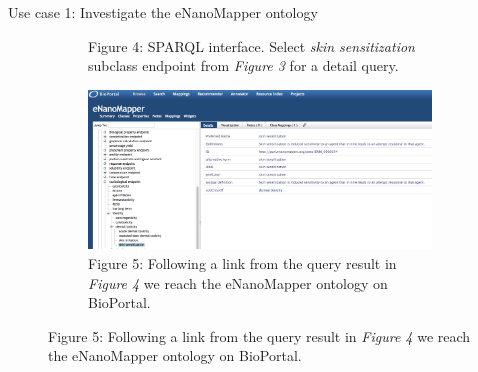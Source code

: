 \documentclass[final]{beamer}
\begin{document}
\begin{frame}{}
\begin{textblock}{62}
\begin{block}{Use case 1: Investigate the eNanoMapper ontology}
\begin{figure}
\begin{subfigure}[c]{0.3\textwidth}
            \caption{Figure 4: SPARQL interface. Select \emph{skin sensitization} subclass endpoint from \emph{Figure 3} for a detail query.}
          \end{subfigure}
          \hspace{0.2\textwidth}
          \begin{subfigure}[c]{0.3\textwidth}
            \includegraphics[width=\textwidth,keepaspectratio]{onto-use-case-1d.png}
            \caption{Figure 5: Following a link from the query result in \emph{Figure 4} we reach the eNanoMapper ontology on BioPortal.}
          \end{subfigure}
        \end{figure}
      \end{block}
    \end{textblock}


\end{frame}
\end{document}

